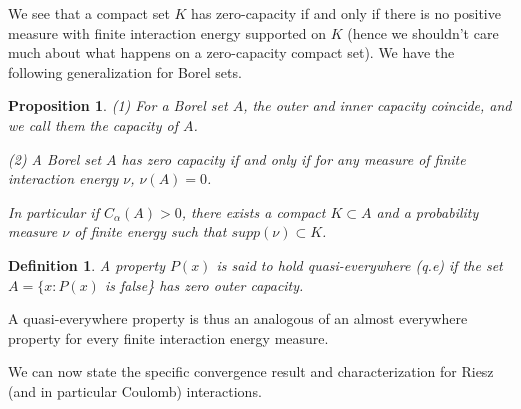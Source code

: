 \documentclass[a4paper,12pt]{report}
\newtheorem*{prop}{Proposition}
\newtheorem*{deft}{Definition}
\begin{document}
We see that a compact set $K$ has zero-capacity if and only if there is no positive measure with finite interaction energy supported on $K$ (hence we shouldn't care much about what happens on a zero-capacity compact set).  We have the following generalization for Borel sets.

\begin{prop}

(1) For a Borel set $A$, the outer and inner capacity coincide, and we call them the capacity of $A$.

(2) A Borel set $A$ has zero capacity if and only if for any measure of finite interaction energy $\nu$, $\nu(A) = 0$.

In particular if $C_{\alpha}(A) > 0$, there exists a compact $K \subset A$ and a probability measure $\nu$ of finite energy such that $supp(\nu) \subset K$.
\end{prop}

\begin{deft}

A property $P(x)$ is said to hold quasi-everywhere (q.e) if the set $A = \{x : P(x)$ is false\} has zero outer capacity.
\end{deft}

A quasi-everywhere property is thus an analogous of an almost everywhere property for every finite interaction energy measure.
\vspace{0.5cm}

We can now state the specific convergence result and characterization for Riesz (and in particular Coulomb) interactions.
\end{document}
